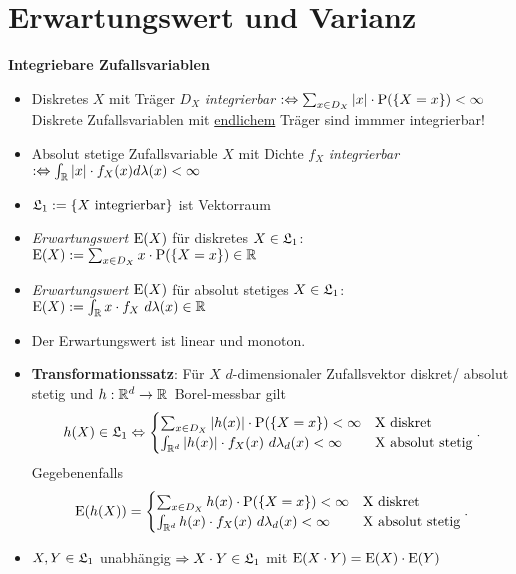\section{Erwartungswert und Varianz}

\textbf{Integriebare Zufallsvariablen}
\begin{itemize}
\item Diskretes $X$ mit Träger $D_X$ \textit{integrierbar}
$:\Leftrightarrow \sum_{x\in D_X} |x|\cdot \P(\{X=x\})<\infty$\\
Diskrete Zufallsvariablen mit \underline{endlichem} Träger sind immmer integrierbar!

\item  Absolut stetige Zufallsvariable $X$ mit Dichte $f_X$ \textit{integrierbar}
\mbox{$:\Leftrightarrow \int_\R |x|\cdot f_X(x)d\lambda(x)<\infty$}

\item $\L_1:=\{X \text{ integrierbar}\}$ ist Vektorraum

\item \textit{Erwartungswert $\E(X)$} für diskretes $X\in\L_1$:
$\E(X):= \sum_{x\in D_X} x\cdot\P(\{X=x\})\in\R$

\item \textit{Erwartungswert $\E(X)$} für absolut stetiges $X\in\L_1$:
$\E(X):= \int_\R x\cdot f_X~d\lambda(x)\in\R$

\item Der Erwartungswert ist linear und monoton.

\item \textbf{Transformationssatz}: Für $X$ $d$-dimensionaler Zufallsvektor diskret/
absolut stetig und \mbox{$h:\R^d\to\R$ Borel-messbar} gilt
\[
	h(X)\in\L_1 \Leftrightarrow
	\begin{cases}
	\sum_{x\in D_X} |h(x)|\cdot\P(\{X=x\})<\infty			& \text{X diskret} \\
	\int_{\R^d} |h(x)|\cdot f_X(x)~d\lambda_d(x)<\infty	& \text{X absolut stetig}
	\end{cases}.
\]
Gegebenenfalls
\[
	\E(h(X))=
	\begin{cases}
	\sum_{x\in D_X} h(x)\cdot\P(\{X=x\})<\infty			& \text{X diskret} \\
	\int_{\R^d} h(x)\cdot f_X(x)~d\lambda_d(x)<\infty		& \text{X absolut stetig}
	\end{cases}.
\]

\item $X,Y\in\L_1$ unabhängig $\Rightarrow X\cdot Y\in\L_1$ mit
$\E(X\cdot Y) = \E(X)\cdot \E(Y)$

\end{itemize}
\hspace{3em}

